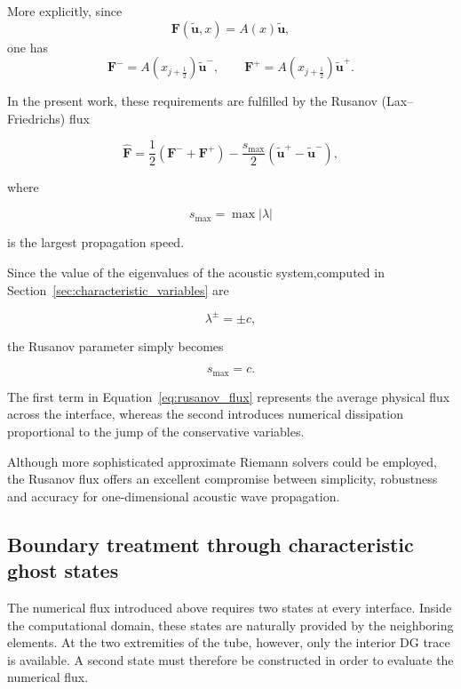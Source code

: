 \documentclass[11pt,a4paper]{report}
\theoremstyle{plain}
\theoremstyle{definition}
\begin{document}
More explicitly, since
\begin{equation}
\mathbf F(\tilde{\mathbf u},x)
=
A(x)\tilde{\mathbf u},
\end{equation}
one has
\begin{equation}
\mathbf F^-
=
A(x_{j+\frac12})\tilde{\mathbf u}^-,
\qquad
\mathbf F^+
=
A(x_{j+\frac12})\tilde{\mathbf u}^+.
\end{equation}

In the present work, these requirements are fulfilled by the Rusanov
(Lax--Friedrichs) flux

\begin{equation}
\boxed{
\widehat{\mathbf F}
=
\frac12
\left(
\mathbf F^-
+
\mathbf F^+
\right)
-
\frac{s_{\max}}{2}
\left(
\tilde{\mathbf u}^+
-
\tilde{\mathbf u}^-
\right),
}
\label{eq:rusanov_flux}
\end{equation}

where

\[
s_{\max}
=
\max |\lambda|
\]

is the largest propagation speed.

Since the value of the  eigenvalues of the acoustic system,computed in Section~\ref{sec:characteristic_variables} are

\[
\lambda^\pm=\pm c,
\]

the Rusanov parameter simply becomes

\begin{equation}
s_{\max}=c.
\end{equation}

The first term in Equation~\eqref{eq:rusanov_flux} represents the average
physical flux across the interface, whereas the second introduces numerical
dissipation proportional to the jump of the conservative variables.

Although more sophisticated approximate Riemann solvers could be employed, the
Rusanov flux offers an excellent compromise between simplicity, robustness and
accuracy for one-dimensional acoustic wave propagation.


\subsection{Boundary treatment through characteristic ghost states}
\label{subsec:boundary_ghost_states}

The numerical flux introduced above requires two states at every interface.
Inside the computational domain, these states are naturally provided by the
neighboring elements. At the two extremities of the tube, however, only the
interior DG trace is available. A second state must therefore be constructed
in order to evaluate the numerical flux.
\end{document}
